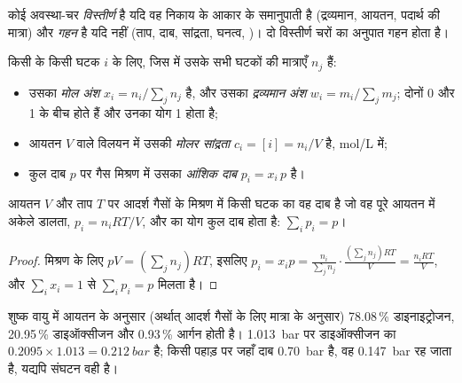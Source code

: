 \begin{definition}[गहन और विस्तीर्ण चर]\label{def:b1:extent-q-and-k:variables}
कोई अवस्था-चर \emph{विस्तीर्ण} है यदि वह
निकाय के आकार के समानुपाती है (द्रव्यमान, आयतन, पदार्थ की
मात्रा) और \emph{गहन} है यदि नहीं
(ताप, दाब, सांद्रता, घनत्व, )। दो विस्तीर्ण चरों का
अनुपात गहन होता है।
\end{definition}

\begin{definition}[संघटन के चर]\label{def:b1:extent-q-and-k:composition}
किसी  के किसी घटक $i$ के लिए, जिस  में उसके सभी
घटकों की मात्राएँ $n_j$ हैं:
\begin{itemize}
  \item उसका \emph{मोल अंश} $x_i = n_i/\sum_j
        n_j$ है, और उसका \emph{द्रव्यमान अंश} $w_i =
        m_i/\sum_j m_j$; दोनों 0 और 1 के बीच होते हैं और उनका योग 1 होता है;
  \item आयतन $V$ वाले विलयन में उसकी \emph{मोलर
        सांद्रता} $c_i = [i] = n_i/V$ है,
        \unit{mol/L} में;
  \item कुल दाब $p$ पर गैस मिश्रण में उसका \emph{आंशिक
        दाब} $p_i = x_i\,p$ है।
\end{itemize}
\end{definition}

\begin{proposition}[आदर्श गैसों के आंशिक दाब]\label{prop:b1:extent-q-and-k:dalton}
आयतन $V$ और ताप $T$ पर आदर्श गैसों के मिश्रण में किसी
घटक का  वह दाब है जो वह पूरे आयतन में अकेले
डालता, $p_i = n_iRT/V$, और  का योग
कुल दाब होता है: $\sum_i p_i = p$।
\end{proposition}

\begin{proof}
मिश्रण के लिए $pV = (\sum_j n_j)RT$, इसलिए $p_i = x_i p = \frac{n_i}{\sum_j
n_j}\cdot\frac{(\sum_j n_j)RT}{V} = \frac{n_iRT}{V}$, और $\sum_i x_i = 1$
से $\sum_i p_i = p$ मिलता है।
\end{proof}

\begin{example}[वायु]\label{ex:b1:extent-q-and-k:air}
शुष्क वायु में आयतन के अनुसार (अर्थात् आदर्श गैसों के लिए मात्रा के अनुसार)
78.08\,\% डाइनाइट्रोजन, 20.95\,\% डाइऑक्सीजन और 0.93\,\% आर्गन होती है।
\qty{1.013}{bar} पर डाइऑक्सीजन का  $0.2095 \times
1.013 = \qty{0.212}{bar}$ है; किसी पहाड़ पर जहाँ दाब
\qty{0.70}{bar} है, वह \qty{0.147}{bar} रह जाता है, यद्यपि संघटन
वही है।
\end{example}

